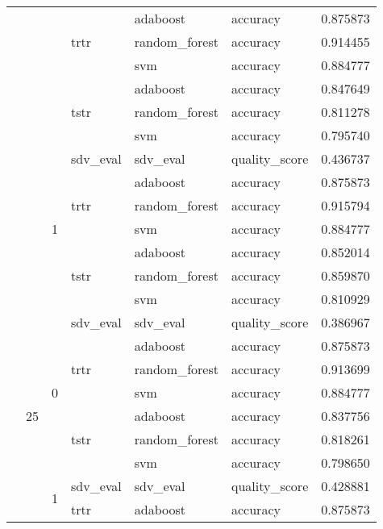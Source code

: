 \begin{longtable}{llllllr}
 &  &  & \multirow[t]{3}{*}{trtr} & adaboost & accuracy & 0.875873 \\
\cline{5-7}
 &  &  &  & random_forest & accuracy & 0.914455 \\
\cline{5-7}
 &  &  &  & svm & accuracy & 0.884777 \\
\cline{4-7} \cline{5-7}
 &  &  & \multirow[t]{3}{*}{tstr} & adaboost & accuracy & 0.847649 \\
\cline{5-7}
 &  &  &  & random_forest & accuracy & 0.811278 \\
\cline{5-7}
 &  &  &  & svm & accuracy & 0.795740 \\
\cline{3-7} \cline{4-7} \cline{5-7}
 &  & \multirow[t]{7}{*}{1} & sdv_eval & sdv_eval & quality_score & 0.436737 \\
\cline{4-7} \cline{5-7}
 &  &  & \multirow[t]{3}{*}{trtr} & adaboost & accuracy & 0.875873 \\
\cline{5-7}
 &  &  &  & random_forest & accuracy & 0.915794 \\
\cline{5-7}
 &  &  &  & svm & accuracy & 0.884777 \\
\cline{4-7} \cline{5-7}
 &  &  & \multirow[t]{3}{*}{tstr} & adaboost & accuracy & 0.852014 \\
\cline{5-7}
 &  &  &  & random_forest & accuracy & 0.859870 \\
\cline{5-7}
 &  &  &  & svm & accuracy & 0.810929 \\
\cline{2-7} \cline{3-7} \cline{4-7} \cline{5-7}
 & \multirow[t]{14}{*}{25} & \multirow[t]{7}{*}{0} & sdv_eval & sdv_eval & quality_score & 0.386967 \\
\cline{4-7} \cline{5-7}
 &  &  & \multirow[t]{3}{*}{trtr} & adaboost & accuracy & 0.875873 \\
\cline{5-7}
 &  &  &  & random_forest & accuracy & 0.913699 \\
\cline{5-7}
 &  &  &  & svm & accuracy & 0.884777 \\
\cline{4-7} \cline{5-7}
 &  &  & \multirow[t]{3}{*}{tstr} & adaboost & accuracy & 0.837756 \\
\cline{5-7}
 &  &  &  & random_forest & accuracy & 0.818261 \\
\cline{5-7}
 &  &  &  & svm & accuracy & 0.798650 \\
\cline{3-7} \cline{4-7} \cline{5-7}
 &  & \multirow[t]{7}{*}{1} & sdv_eval & sdv_eval & quality_score & 0.428881 \\
\cline{4-7} \cline{5-7}
 &  &  & \multirow[t]{3}{*}{trtr} & adaboost & accuracy & 0.875873 \\
\cline{5-7}

\end{longtable}
